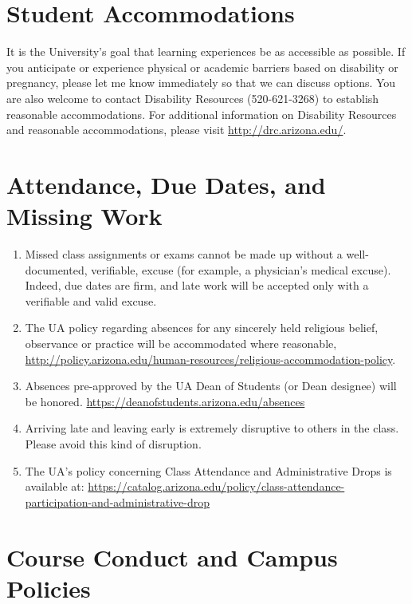 \documentclass[
]{book}
\providecommand{\tightlist}{%
  \setlength{\itemsep}{0pt}\setlength{\parskip}{0pt}}
\begin{document}
\hypertarget{student-accommodations}{%
\section{Student Accommodations}\label{student-accommodations}}

It is the University's goal that learning experiences be as accessible as possible. If you anticipate or experience physical or academic barriers based on disability or pregnancy, please let me know immediately so that we can discuss options. You are also welcome to contact Disability Resources (520-621-3268) to establish reasonable accommodations. For additional information on Disability Resources and reasonable accommodations, please visit \url{http://drc.arizona.edu/}.

\hypertarget{attendance-due-dates-and-missing-work}{%
\section{Attendance, Due Dates, and Missing Work}\label{attendance-due-dates-and-missing-work}}

\begin{enumerate}
\def\labelenumi{\arabic{enumi}.}
\tightlist
\item
  Missed class assignments or exams cannot be made up without a well-documented, verifiable, excuse (for example, a physician's medical excuse). Indeed, due dates are firm, and late work will be accepted only with a verifiable and valid excuse.
\item
  The UA policy regarding absences for any sincerely held religious belief, observance or practice will be accommodated where reasonable, \url{http://policy.arizona.edu/human-resources/religious-accommodation-policy}.
\item
  Absences pre-approved by the UA Dean of Students (or Dean designee) will be honored. \url{https://deanofstudents.arizona.edu/absences}\\
\item
  Arriving late and leaving early is extremely disruptive to others in the class. Please avoid this kind of disruption.
\item
  The UA's policy concerning Class Attendance and Administrative Drops is available at: \url{https://catalog.arizona.edu/policy/class-attendance-participation-and-administrative-drop}
\end{enumerate}

\hypertarget{course-conduct-and-campus-policies}{%
\section{Course Conduct and Campus Policies}\label{course-conduct-and-campus-policies}}
\end{document}
